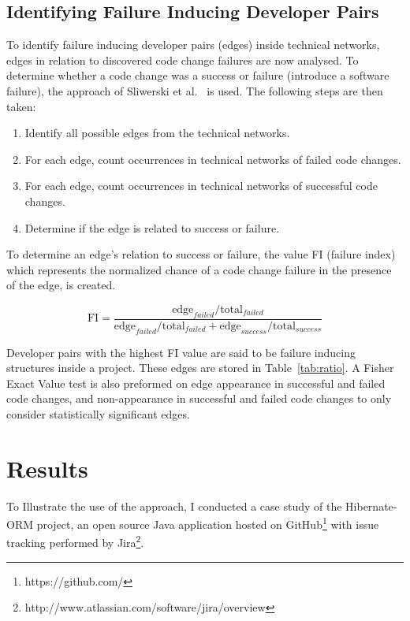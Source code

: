 \documentclass[conference]{IEEEtran}
\begin{document}
\subsection{Identifying Failure Inducing Developer Pairs}
To identify failure inducing developer pairs (edges) inside technical networks, 
edges in relation to discovered code change failures are now analysed. To determine whether a code change 
was a success or failure (introduce a software failure), the approach of
Sliwerski et al.~\cite{Sliwerski:2005:CIF} is used. The following steps are then taken:

\begin{enumerate}
\item Identify all possible edges from the technical networks.
\item For each edge, count occurrences in technical networks of failed code changes.
\item For each edge, count occurrences in technical networks of successful code changes.
\item Determine if the edge is related to success or failure.
\end{enumerate}

To determine an edge's relation to success or failure,  the value FI (failure
index) which represents the normalized chance of a code change failure in the presence
of the edge, is created. 

\begin{equation}
\text{FI} = \frac{ \text{edge}_{failed} / \text{total}_{failed}}{\text{edge}_{failed} / \text{total}_{failed} + \text{edge}_{success} / \text{total}_{success}}
\end{equation}

Developer pairs with the highest FI value are said to be failure inducing structures
inside a project. These edges are stored in Table~\ref{tab:ratio}. A Fisher Exact Value test 
is also preformed on edge appearance in successful and failed
code changes, and non-appearance in successful and failed code changes to only
consider statistically significant edges. 


\section{Results}
To Illustrate the use of the approach, I conducted a case study of
the Hibernate-ORM project, an open source Java 
application hosted on GitHub\footnote{https://github.com/} with issue tracking 
performed by Jira\footnote{http://www.atlassian.com/software/jira/overview}.
\end{document}
